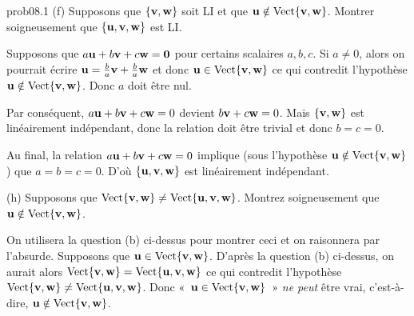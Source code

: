 \begin{sol}{prob08.1}
(f) Supposons que $\set{\vv,\ww}$ soit LI et que $\uu \notin \sp{\vv,\ww}$. Montrer soigneusement que $\set{\uu,\vv,\ww}$ est LI.

\soln Supposons que $a \uu + b\vv+ c\ww=\zero$ pour certains scalaires $a,b,c$. Si $a\not=0$, alors on pourrait écrire $\uu= \frac{b}{a} \vv+ \frac{b}{a} \ww$ et donc $\uu \in \sp{\vv,\ww}$ ce qui contredit l'hypothèse  $\uu \notin \sp{\vv,\ww}$. Donc $a$ doit être nul. 

Par conséquent, $a \uu + b\vv+ c\ww=0$ devient  $b\vv+ c\ww=0$. Mais $\set{\vv,\ww}$ est linéairement indépendant, donc la relation doit être trivial et donc $b=c=0$. 

Au final, la relation $a \uu + b\vv+ c\ww=0$ implique (sous l'hypothèse  $\uu \notin \sp{\vv,\ww}$) que $a=b=c=0$. D'o\`u $\set{\uu,\vv,\ww}$ est linéairement indépendant.
\medskip
  

(h) Supposons que $\sp{\vv,\ww}\not=\sp{\uu,\vv,\ww}$. Montrez soigneusement que $\uu \notin \sp{\vv,\ww}$.

\soln On utilisera la question (b) ci-dessus pour montrer ceci et on raisonnera par l'absurde.  Supposons que $\uu\in \sp{\vv,\ww}$. D'après la question (b) ci-dessus, on aurait alors $\sp{\vv,\ww}=\sp{\uu,\vv,\ww}$ ce qui contredit l'hypothèse $\sp{\vv,\ww}\not=\sp{\uu,\vv,\ww}$. Donc «~$\uu\in \sp{\vv,\ww}$~» {\it ne peut} être vrai, c'est-à-dire, $\uu\notin \sp{\vv,\ww}$.
\medskip

\end{sol}


